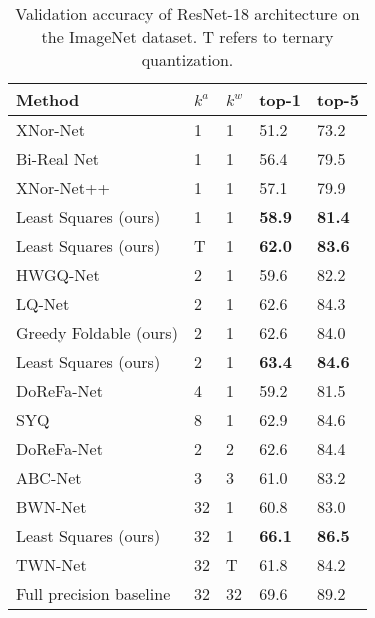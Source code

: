 \documentclass[10pt,twocolumn,letterpaper]{article}
\begin{document}
\begin{table}
\begin{center}
  \begin{tabular}{lllll}
  \hline
 Method & $k^a$ & $k^w$& top-1& top-5\\
  \hline
  \hline
   XNor-Net~\cite{rastegari2016xnor} & 1 & 1 & 51.2 & 73.2 \\
   Bi-Real Net~\cite{liu2018bi}& 1 & 1 & 56.4 & 79.5 \\
   XNor-Net++~\cite{bulat2019xnor}&1&1&57.1&79.9\\
  Least Squares (ours) & 1 & 1 & \bf 58.9 &\bf  \bf 81.4 \\
   \hline
   Least Squares (ours)&  T &  1 &\bf 62.0 &\bf 83.6 \\
   \hline
     HWGQ-Net~\cite{cai2017deep}& 2 & 1 &59.6 & 82.2\\
  LQ-Net~\cite{zhang2018lq}& 2 & 1 & 62.6 & 84.3\\
    Greedy Foldable (ours)&  2 &  1 & 62.6 &  84.0 \\
  Least Squares (ours)&  2 &  1 & \bf 63.4&\bf 84.6 \\
   \hline
   DoReFa-Net~\cite{zhou2016dorefa} & 4 & 1 & 59.2 & 81.5\\
   \hline
      SYQ~\cite{faraone2018syq} & 8 & 1 & 62.9 & 84.6\\
      \hline
    DoReFa-Net~\cite{zhou2016dorefa} & 2 & 2 & 62.6 & 84.4\\
    \hline
  ABC-Net~\cite{lin2017towards} & 3 & 3 & 61.0 & 83.2\\
     \hline
   BWN-Net~\cite{rastegari2016xnor} &  32 & 1& 60.8 & 83.0 \\
  Least Squares (ours)&   32 &  1 & \bf 66.1&\bf 86.5\\
   \hline
  TWN-Net~\cite{li2016ternary} & 32 & T & 61.8 & 84.2\\
   \hline
  Full precision baseline &   32 &  32&  69.6 &  89.2 \\
  \end{tabular}
   \caption{Validation accuracy of ResNet-18 architecture on the ImageNet dataset.
   T refers to ternary quantization.
    }
  \label{tab:compare_ex}
\end{center}
\end{table}

\end{document}

